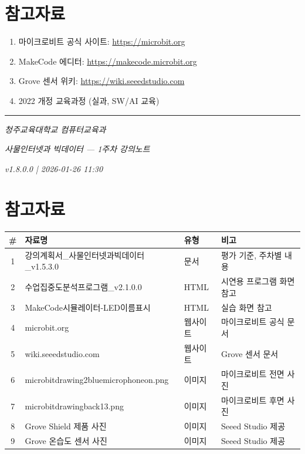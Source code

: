 \documentclass[11pt, a4paper]{article}
\begin{document}
\section*{참고자료}

\begin{enumerate}
    \item 마이크로비트 공식 사이트: \url{https://microbit.org}
    \item MakeCode 에디터: \url{https://makecode.microbit.org}
    \item Grove 센서 위키: \url{https://wiki.seeedstudio.com}
    \item 2022 개정 교육과정 (실과, SW/AI 교육)
\end{enumerate}

\vfill

\begin{center}
\rule{0.5\textwidth}{0.4pt}

\textit{청주교육대학교 컴퓨터교육과}

\textit{사물인터넷과 빅데이터 --- 1주차 강의노트}

\textit{v1.8.0.0 | 2026-01-26 11:30}
\end{center}

\newpage
\section*{참고자료}

\begin{table}[H]
\centering
\begin{tabularx}{\textwidth}{c l l X}
\toprule
\textbf{\#} & \textbf{자료명} & \textbf{유형} & \textbf{비고} \\
\midrule
1 & 강의계획서\_사물인터넷과빅데이터\_v1.5.3.0 & 문서 & 평가 기준, 주차별 내용 \\
2 & 수업집중도분석프로그램\_v2.1.0.0 & HTML & 시연용 프로그램 화면 참고 \\
3 & MakeCode시뮬레이터-LED이름표시 & HTML & 실습 화면 참고 \\
4 & microbit.org & 웹사이트 & 마이크로비트 공식 문서 \\
5 & wiki.seeedstudio.com & 웹사이트 & Grove 센서 문서 \\
6 & microbitdrawing2bluemicrophoneon.png & 이미지 & 마이크로비트 전면 사진 \\
7 & microbitdrawingback13.png & 이미지 & 마이크로비트 후면 사진 \\
8 & Grove Shield 제품 사진 & 이미지 & Seeed Studio 제공 \\
9 & Grove 온습도 센서 사진 & 이미지 & Seeed Studio 제공 \\
\bottomrule
\end{tabularx}
\end{table}
\end{document}
